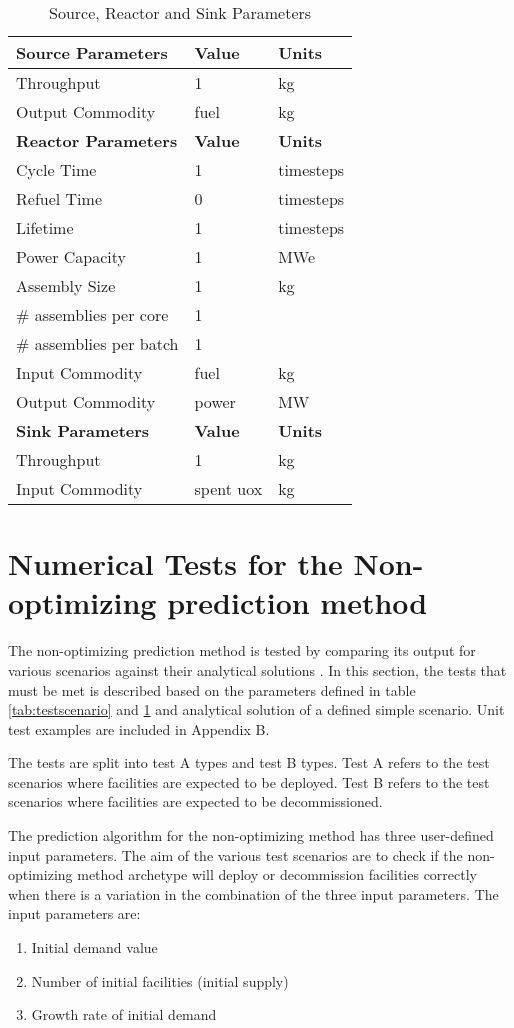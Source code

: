 \documentclass[11pt,letterpaper]{article}
\begin{document}
\begin{table}[H]
	\centering
    \caption {Source, Reactor and Sink Parameters}
	\label{tab:reactor}
	\begin{tabular}{|l|l|l|}
\hline
\textbf{Source Parameters} & \textbf{Value} & \textbf{Units} \\
\hline
Throughput & 1 & kg \\
Output Commodity & fuel & kg\\
\hline
\textbf{Reactor Parameters} & \textbf{Value} & \textbf{Units} \\
\hline
Cycle Time & 1 & timesteps \\
Refuel Time & 0 & timesteps \\
Lifetime & 1 & timesteps \\
Power Capacity & 1& MWe \\
Assembly Size & 1 & kg \\
\# assemblies per core & 1 & \\
\# assemblies per batch & 1 & \\
Input Commodity & fuel & kg\\
Output Commodity & power & MW\\
\hline
\textbf{Sink Parameters} & \textbf{Value} & \textbf{Units} \\
Throughput & 1 & kg \\
Input Commodity & spent uox & kg\\
\hline
	\end{tabular}
\end{table}

\pagebreak

\section{Numerical Tests for the Non-optimizing prediction method}
The non-optimizing prediction method is tested by comparing its output for various scenarios against their analytical solutions . In this section, the tests that must be met is described based on the parameters defined in table \ref{tab:testscenario} and \ref{tab:reactor} and analytical solution of a defined simple scenario. Unit test examples are included in Appendix B.

The tests are split into test A types and test B types. Test A refers to the test scenarios where facilities are expected to be deployed. Test B refers to the test scenarios where facilities are expected to be decommissioned. 

The prediction algorithm for the non-optimizing method has three user-defined input parameters. The aim of the various test scenarios are to check if the non-optimizing method archetype will deploy or decommission facilities correctly when there is a variation in the combination of the three input parameters.  The input parameters are: 
\begin{enumerate}
	\item Initial demand value  
	\item Number of initial facilities (initial supply)
	\item Growth rate of initial demand
\end{enumerate}
\end{document}
